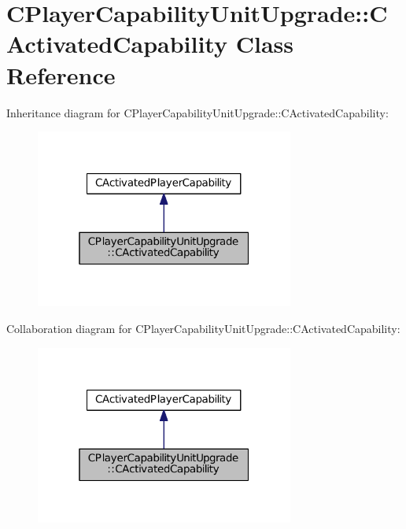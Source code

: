 \hypertarget{classCPlayerCapabilityUnitUpgrade_1_1CActivatedCapability}{}\section{C\+Player\+Capability\+Unit\+Upgrade\+:\+:C\+Activated\+Capability Class Reference}
\label{classCPlayerCapabilityUnitUpgrade_1_1CActivatedCapability}


Inheritance diagram for C\+Player\+Capability\+Unit\+Upgrade\+:\+:C\+Activated\+Capability\+:\nopagebreak
\begin{figure}[H]
\begin{center}
\leavevmode
\includegraphics[width=241pt]{classCPlayerCapabilityUnitUpgrade_1_1CActivatedCapability__inherit__graph}
\end{center}
\end{figure}


Collaboration diagram for C\+Player\+Capability\+Unit\+Upgrade\+:\+:C\+Activated\+Capability\+:\nopagebreak
\begin{figure}[H]
\begin{center}
\leavevmode
\includegraphics[width=241pt]{classCPlayerCapabilityUnitUpgrade_1_1CActivatedCapability__coll__graph}
\end{center}
\end{figure}
